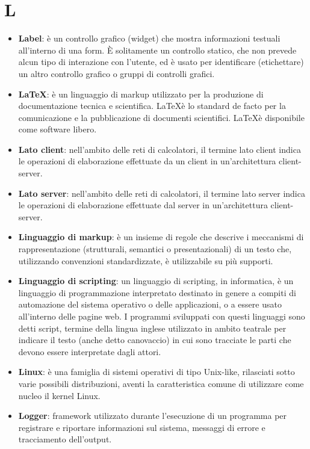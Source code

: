 \section{L}
\begin{itemize}
	\item
	\textbf{Label}: è un controllo grafico (widget) che mostra informazioni testuali all'interno di una form. È solitamente un controllo statico, che non prevede alcun tipo di interazione con l'utente, ed è usato per identificare (etichettare) un altro controllo grafico o gruppi di controlli grafici. 
	\item
	\textbf{\LaTeX}: è un linguaggio di markup utilizzato per la produzione di documentazione tecnica e scientifica. \LaTeX è lo standard de facto per la comunicazione e la pubblicazione di documenti scientifici. \LaTeX è disponibile come software libero.
	\item
	\textbf{Lato client}: nell'ambito delle reti di calcolatori, il termine lato client indica le operazioni di elaborazione effettuate da un client in un'architettura client-server.
	\item
	\textbf{Lato server}: nell'ambito delle reti di calcolatori, il termine lato server indica le operazioni di elaborazione effettuate dal server in un'architettura client-server.
	\item
	\textbf{Linguaggio di markup}: è un insieme di regole che descrive i meccanismi di rappresentazione (strutturali, semantici o presentazionali) di un testo che, utilizzando convenzioni standardizzate, è utilizzabile su più supporti.
	\item
	\textbf{Linguaggio di scripting}: un linguaggio di scripting, in informatica, è un linguaggio di programmazione interpretato destinato in genere a compiti di automazione del sistema operativo o delle applicazioni, o a essere usato all'interno delle pagine web.
	I programmi sviluppati con questi linguaggi sono detti script, termine della lingua inglese utilizzato in ambito teatrale per indicare il testo (anche detto canovaccio) in cui sono tracciate le parti che devono essere interpretate dagli attori.
	\item
	\textbf{Linux}: è una famiglia di sistemi operativi di tipo Unix-like, rilasciati sotto varie possibili distribuzioni, aventi la caratteristica comune di utilizzare come nucleo il kernel Linux.
	\item
	\textbf{Logger}: framework utilizzato durante l'esecuzione di un programma per registrare e riportare informazioni sul sistema, messaggi di errore e tracciamento dell'output.
\end{itemize}